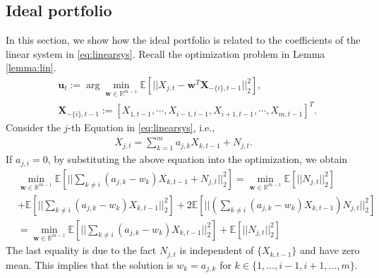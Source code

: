 \subsection{Ideal portfolio}
In this section, we show how the ideal portfolio is related to the coefficients of the linear system in \eqref{eq:linearsys}.  
Recall the optimization problem in Lemma \ref{lemma:lin}. 
\begin{align*}
&\textbf{u}_t:=\arg\min_{\textbf{w}\in\mathbb{R}^{m-1}}\mathbb{E}\left[||X_{j,t}- \textbf{w}^T \textbf{X}_{-\{i\},t-1}||_2^2\right],\\
&\textbf{X}_{-\{i\},t-1} :=[X_{1,t-1},\cdots, X_{i-1,t-1}, X_{i+1,t-1}, \cdots, X_{m,t-1} ]^T.
\end{align*}
Consider the $j$-th Equation in \eqref{eq:linearsys}, i.e., 
\begin{align*}
    X_{j,t}=\sum_{k=1}^m a_{j,k}X_{k,t-1}+N_{j,t}.
\end{align*}
If $a_{j,i}=0$, by substituting the above equation into the optimization, we obtain
\begin{align*}
&\min_{\textbf{w}\in\mathbb{R}^{m-1}}\mathbb{E}\left[||\sum_{k\neq i} (a_{j,k}-w_{k})X_{k,t-1}+N_{j,t}||_2^2\right]=\min_{\textbf{w}\in\mathbb{R}^{m-1}}\mathbb{E}\left[||N_{j,t}||_2^2\right]\\
&+\mathbb{E}\left[||\sum_{k\neq i} (a_{j,k}-w_{k})X_{k,t-1}||_2^2\right]+2\mathbb{E}\left[||\left(\sum_{k\neq i} (a_{j,k}-w_{k})X_{k,t-1}\right)N_{j,t}||_2^2\right]\\
&=\min_{\textbf{w}\in\mathbb{R}^{m-1}}\mathbb{E}\left[||\sum_{k\neq i} (a_{j,k}-w_{k})X_{k,t-1}||_2^2\right]+\mathbb{E}\left[||N_{j,t}||_2^2\right]
\end{align*}
The last equality is due to the fact $N_{j,t}$ is independent of $\{X_{k,t-1}\}$ and have zero mean. This implies that the solution is $w_k=a_{j,k}$ for $k\in\{1,...,i-1,i+1,...,m\}$.











